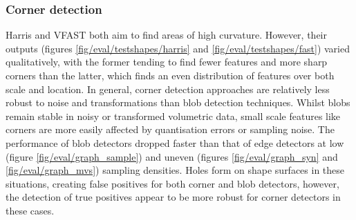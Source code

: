 \subsubsection{Corner detection} Harris and VFAST both aim to find areas of high curvature. However, their outputs (figures \ref{fig/eval/testshapes/harris} and \ref{fig/eval/testshapes/fast}) varied qualitatively, with the former tending to find fewer features and more sharp corners than the latter, which finds an even distribution of features over both scale and location. In general, corner detection approaches are relatively less robust to noise and transformations than blob detection techniques. Whilst blobs remain stable in noisy or transformed volumetric data, small scale features like corners are more easily affected by quantisation errors or sampling noise. 
The performance of blob detectors dropped faster than that of edge detectors at low (figure \ref{fig/eval/graph_sample}) and uneven (figures \ref{fig/eval/graph_syn} and \ref{fig/eval/graph_mvs}) sampling densities. Holes form on shape surfaces in these situations, creating false positives for both corner and blob detectors, however, the detection of true positives appear to be more robust for corner detectors in these cases. 

